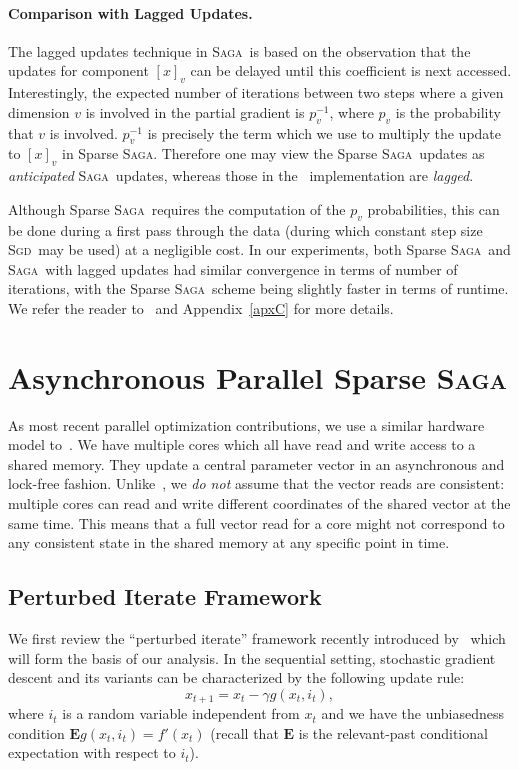 \documentclass[twoside]{article}
\newcommand{\stepsize}{\gamma}
\newcommand{\Econd}{\mathbf{E}}
\newcommand{\SAGA}{\textsc{Saga}}
\newcommand{\SGD}{\textsc{Sgd}}
\begin{document}
\paragraph{Comparison with Lagged Updates.}
The lagged updates technique in \SAGA\ is based on the observation that the updates for component $[x]_v$ can be delayed until this coefficient is next accessed. 
Interestingly, the expected number of iterations between two steps where a given dimension $v$ is involved in the partial gradient is $p_v^{-1}$, where $p_v$ is the probability that $v$ is involved. 
$p_v^{-1}$ is precisely the term which we use to multiply the update to $[x]_v$ in Sparse \SAGA. 
Therefore one may view the Sparse \SAGA\ updates as \textit{anticipated} \SAGA\ updates, whereas those in the~\citet{laggedsaga} implementation are \textit{lagged}. 

Although Sparse \SAGA\ requires the computation of the $p_v$ probabilities, this can be done during a first pass through the data (during which constant step size \SGD\ may be used) at a negligible cost. 
In our experiments, both Sparse \SAGA\ and \SAGA\ with lagged updates had similar convergence in terms of number of iterations, with the Sparse \SAGA\ scheme being slightly faster in terms of runtime. 
We refer the reader to~\citet{laggedsaga} and Appendix~\ref{apxC} for more details.

\section{Asynchronous Parallel Sparse \SAGA} \label{sec:ASAGA}
\vspace{-2mm}
As most recent parallel optimization contributions, we use a similar hardware model to~\citet{hogwild}. 
We have multiple cores which all have read and write access to a shared memory. 
They update a central parameter vector in an asynchronous and lock-free fashion. 
Unlike~\citet{hogwild}, we \emph{do not} assume that the vector reads are consistent: multiple cores can read and write different coordinates of the shared vector at the same time. This means that a full vector read for a core might not correspond to any consistent state in the shared memory at any specific point in time. 

\vspace{-1mm}
\subsection{Perturbed Iterate Framework}
\vspace{-2mm}
We first review the ``perturbed iterate'' framework recently introduced by~\citet{mania} which will form the basis of our analysis. 
In the sequential setting, stochastic gradient descent and its variants can be characterized by the following update rule:
\begin{equation}
x_{t+1} = x_t -\stepsize g(x_t, i_t),
\end{equation}
where $i_t$ is a random variable independent from $x_t$ and we have the unbiasedness condition $\Econd g(x_t, i_t) = f'(x_t)$ (recall that $\Econd$ is the relevant-past conditional expectation with respect to $i_t$).
\end{document}
